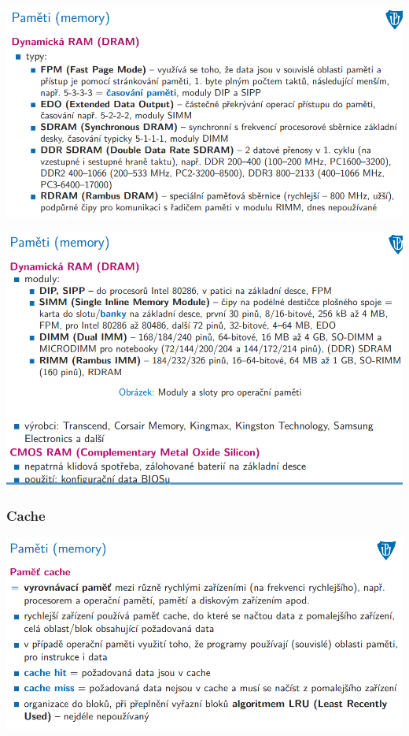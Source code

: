 \documentclass[10pt,a4paper]{article}
\begin{document}
\includegraphics[scale=0.65]{img/prvni_odstavec/otazka6/pamet6.png}

\includegraphics[scale=0.65]{img/prvni_odstavec/otazka6/pamet7.png}

\subsubsection{Cache}
\includegraphics[scale=0.65]{img/prvni_odstavec/otazka6/pamet8.png}
\end{document}
